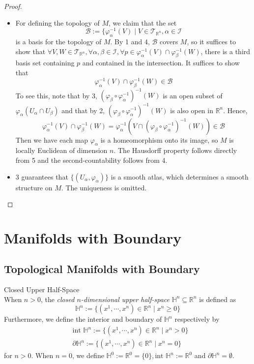 \begin{proof}
    \begin{itemize}
        \item For defining the topology of $M$, we claim that the set
        \[
        \mathcal{B}:= \{\varphi^{-1} _\alpha (V) \mid V\in \mathcal{T}_{\mathbb{R}^n} ,\alpha\in \mathcal{I}
        \]
        is a basis for the topology of $M$. By 1 and 4, $\mathcal{B}$ covers $M$, so it suffices to show that $\forall V,W\in \mathcal{T}_{\mathbb{R}^n}, \forall \alpha, \beta\in \mathcal{I}, \forall p\in \varphi_\alpha^{-1} (V) \cap \varphi^{-1}_\beta (W)$, there is a third basis set containing $p$ and contained in the intersection. It suffices to show that
        \[
        \varphi_\alpha^{-1} (V) \cap \varphi_\beta^{-1} (W)\in \mathcal{B}
        \]
        To see this, note that by 3, $(\varphi_\beta \circ \varphi_\alpha^{-1})^{-1} (W)$ is an open subset of $\varphi_\alpha (U_\alpha \cap U_\beta)$ and that by 2, $(\varphi_\beta \circ \varphi_\alpha^{-1})^{-1} (W)$ is also open in $\mathbb{R}^n$. Hence, 
        \[
        \varphi^{-1} _\alpha (V) \cap \varphi_\beta^{-1} (W) = \varphi_\alpha^{-1} (V \cap (\varphi_\beta \circ \varphi_\alpha^{-1})^{-1} (W)) \in \mathcal{B}
        \]
        Then we have each map $\varphi_\alpha$ is a homeomorphism onto its image, so $M$ is locally Euclidean of dimension $n$. The Hausdorff property follows directly from 5 and the second-countability follows from 4.

        \item 3 guarantees that $\{(U_\alpha, \varphi_\alpha)\}$ is a smooth atlas, which determines a smooth structure on $M$. The uniqueness is omitted.
    \end{itemize}
\end{proof}

\section{Manifolds with Boundary}

\subsection{Topological Manifolds with Boundary}

\begin{definition}{Closed Upper Half-Space}\\
When $n>0$, the \textit{closed $n$-dimensional upper half-space} $\mathbb{H}^n \subseteq \mathbb{R}^n$ is defined as
\[
\mathbb{H}^n:= \{(x^1 ,\cdots, x^n)\in \mathbb{R}^n \mid x^n\geq0\}
\]
Furthermore, we define the interior and boundary of $\mathbb{H}^n$ respectively by
\begin{align*}
    &\text{int }\mathbb{H}^n:= \{ (x^1, \cdots, x^n) \in \mathbb{R}^n \mid x^n>0\}\\
    &\partial \mathbb{H}^n:= \{ (x^1 ,\cdots, x^n) \in \mathbb{R}^n \mid x^n=0\}
\end{align*}
for $n>0$. When $n=0$, we define $\mathbb{H}^0:= \mathbb{R}^0=\{0\}, \text{int }\mathbb{H}^n :=\mathbb{R}^0$ and $\partial\mathbb{H}^n=\emptyset$.
\end{definition}

